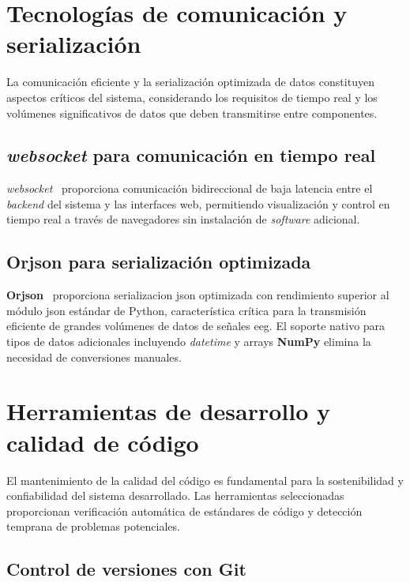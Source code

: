 \section{Tecnologías de comunicación y serialización}
\label{sec:comunicacion_serializacion}

La comunicación eficiente y la serialización optimizada de datos constituyen aspectos críticos del sistema, considerando los requisitos de tiempo real y los volúmenes significativos de datos que deben transmitirse entre componentes.

\subsection{\textit{\gls{websocket}} para comunicación en tiempo real}
\label{subsec:websocket_tiempo_real}

\textit{\gls{websocket}}~\cite{websocket_rfc} proporciona comunicación bidireccional de baja latencia entre el \textit{backend} del sistema y las interfaces web, permitiendo visualización y control en tiempo real a través de navegadores sin instalación de \textit{software} adicional.

\subsection{Orjson para serialización optimizada}
\label{subsec:orjson_serializacion}

\textbf{Orjson}~\cite{orjson_docs} proporciona \gls{serializacion} \acrshort{json} optimizada con rendimiento superior al módulo \acrshort{json} estándar de Python, característica crítica para la transmisión eficiente de grandes volúmenes de datos de señales \acrshort{eeg}. El soporte nativo para tipos de datos adicionales incluyendo \textit{datetime} y arrays \textbf{NumPy} elimina la necesidad de conversiones manuales.

\section[Herramientas desarrollo y calidad de código]{Herramientas de desarrollo y calidad de código}
\label{sec:herramientas_calidad}

El mantenimiento de la calidad del código es fundamental para la sostenibilidad y confiabilidad del sistema desarrollado. Las herramientas seleccionadas proporcionan verificación automática de estándares de código y detección temprana de problemas potenciales.

\subsection{Control de versiones con Git}
\label{subsec:git_control_versiones}

